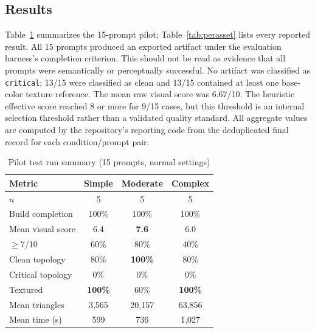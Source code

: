 \documentclass[conference]{IEEEtran}
\begin{document}
\subsection{Results}
Table~\ref{tab:overall} summarizes the 15-prompt pilot; Table~\ref{tab:perasset} lists every reported result. All 15 prompts produced an exported artifact under the evaluation harness's completion criterion. This should not be read as evidence that all prompts were semantically or perceptually successful. No artifact was classified as \texttt{critical}; 13/15 were classified as clean and 13/15 contained at least one base-color texture reference. The mean raw visual score was 6.67/10. The heuristic effective score reached 8 or more for 9/15 cases, but this threshold is an internal selection threshold rather than a validated quality standard. All aggregate values are computed by the repository's reporting code from the deduplicated final record for each condition/prompt pair.

\begin{table}[t]
\centering
\caption{Pilot test run summary (15 prompts, normal settings)}
\label{tab:overall}
\begin{tabular}{lccc}
\toprule
Metric & Simple & Moderate & Complex \\
\midrule
$n$ & 5 & 5 & 5 \\
Build completion & 100\% & 100\% & 100\% \\
Mean visual score & 6.4 & \textbf{7.6} & 6.0 \\
$\geq$7/10 & 60\% & 80\% & 40\% \\
Clean topology & 80\% & \textbf{100\%} & 80\% \\
Critical topology & 0\% & 0\% & 0\% \\
Textured & \textbf{100\%} & 60\% & \textbf{100\%} \\
Mean triangles & 3{,}565 & 20{,}157 & 63{,}856 \\
Mean time (s) & 599 & 736 & 1{,}027 \\
\bottomrule
\end{tabular}
\end{table}
\end{document}
